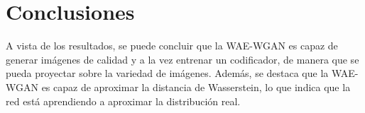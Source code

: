 \section{Conclusiones}\label{sec:conclusiones-wae-wgan}  %


A vista de los resultados, se puede concluir que la WAE-WGAN es capaz de generar imágenes de calidad y a la vez entrenar un codificador, de manera que se pueda proyectar sobre la variedad de imágenes. Además, se destaca que la WAE-WGAN es capaz de aproximar la distancia de Wasserstein, lo que indica que la red está aprendiendo a aproximar la distribución real.

